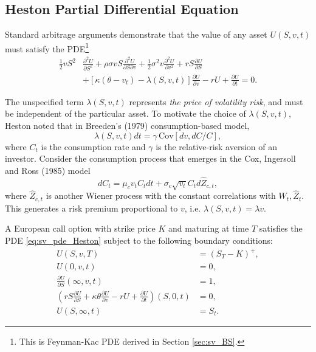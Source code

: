 \documentclass[a4paper,12pt]{article}
\numberwithin{equation}{section}
\theoremstyle{definition}
\theoremstyle{remark}
\begin{document}
\subsection{Heston Partial Differential Equation}
Standard arbitrage arguments demonstrate that the value of any 
asset $U(S,v,t)$ must satisfy the PDE\footnote{This is Feynman-Kac 
PDE derived in Section \ref{sec:sv_BS}.}
\begin{equation}
\label{eq:sv_pde_Heston}
\begin{split}
    \frac{1}{2}vS^{2} & \frac{\partial^{2} U}{\partial {S}^{2}}
    +\rho\sigma vS\frac{\partial^{2} U}{\partial {S} \partial {v}}
    +\frac{1}{2}\sigma^{2}v\frac{\partial^{2} U}{\partial {v}^{2}}+rS\frac{\partial U}{\partial S} \\
    & +[\kappa(\theta-v_{t})-\lambda(S,v,t)]\frac{\partial U}{\partial v}
    -rU+\frac{\partial U}{\partial t}=0.
\end{split}    
\end{equation}

The unspecified term $\lambda(S,v,t)$ represents \textit{the price 
of volatility risk}, and must be independent of the particular 
asset. To motivate the choice of $\lambda(S,v,t)$, Heston noted 
that in Breeden's (1979) consumption-based model, 
\begin{equation}
\label{eq:volatility_risk_price}
    \lambda(S,v,t)dt=\gamma\,\mathrm{Cov}[dv,dC/C],
\end{equation}
where $C_{t}$ is the consumption rate and $\gamma$ is the 
relative-risk aversion of an investor. Consider the consumption 
process that emerges in the Cox, Ingersoll and Ross (1985) model 
\begin{equation}
\label{eq:CIR_consumption}
    dC_{t}=\mu_{c}v_{t}C_{t}dt+\sigma_{c}\sqrt{v_{t}}C_{t}d\hat{Z}_{c,t},
\end{equation}
where $\hat{Z}_{c,t}$ is another Wiener process with the constant 
correlations with $W_{t},\hat{Z}_{t}$. This generates a risk 
premium proportional to $v$, i.e. $\lambda(S,v,t)=\lambda v$.

A European call option with strike price $K$ and maturing at time 
$T$ satisfies the PDE \eqref{eq:sv_pde_Heston} subject to the 
following boundary conditions:
\begin{equation}
    \label{eq:Heston_boundary_conditions}
    \begin{split}
        U(S,v,T)&=(S_{T}-K)^{+}, \\
        U(0,v,t)&=0, \\
        \frac{\partial U}{\partial S}(\infty,v,t)&=1, \\
        \left(rS\frac{\partial U}{\partial S}+\kappa\theta
        \frac{\partial U}{\partial v}-rU
        +\frac{\partial U}{\partial t}\right)(S,0,t)&=0, \\
        U(S,\infty,t)&=S_{t}.
    \end{split}
\end{equation}
\end{document}
